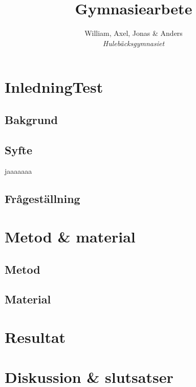 \documentclass[]{article}
\title{Gymnasiearbete}
\author{William, Axel, Jonas \& Anders \\
\emph{Hulebäcksgymnasiet}}
\begin{document}
\maketitle
\section{InledningTest}

\subsection{Bakgrund}

\subsection{Syfte}
jaaaaaaa
\subsection{Frågeställning}

\section{Metod \& material}

\subsection{Metod}

\subsection{Material}

\section{Resultat}

\section{Diskussion \& slutsatser}
\end{document}
